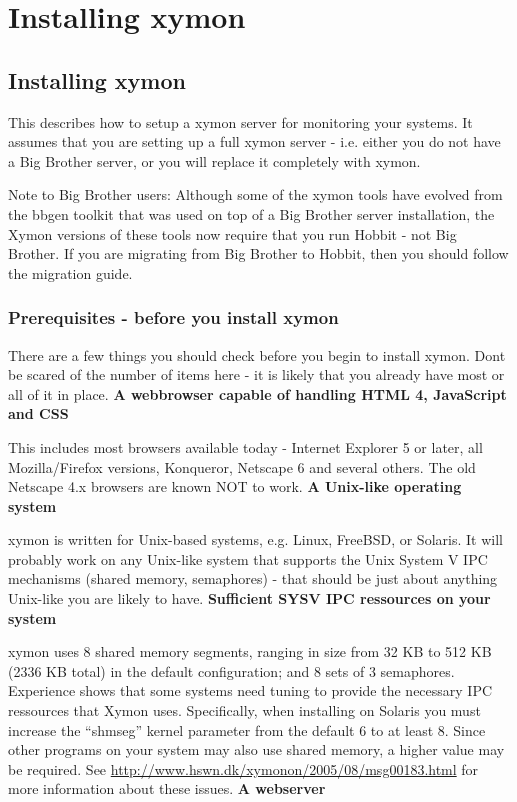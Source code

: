 \chapter{Installing xymon}
\section{Installing xymon}


 This describes how to setup a xymon server for monitoring your
 systems. It assumes that you are setting up a full xymon server -
 i.e. either you do not have a Big Brother server, or you will replace
 it completely with xymon.



 Note to Big Brother users: Although some of the xymon tools have evolved from the bbgen toolkit that was used on top of a Big Brother server installation, the Xymon versions of these tools now require that you run Hobbit - not Big Brother. If you are migrating from Big Brother to Hobbit, then you should follow the migration guide.
\subsection{Prerequisites - before you install xymon}


 There are a few things you should check before you begin to install xymon. Dont be scared of the number of items here - it is likely that you already have most or all of it in place.
\textbf{A webbrowser capable of handling HTML 4, JavaScript and CSS}


 This includes most browsers available today - Internet Explorer 5 or later, all Mozilla/Firefox versions, Konqueror, Netscape 6 and several others. The old Netscape 4.x browsers are known NOT to work.
\textbf{A Unix-like operating system}


 xymon is written for Unix-based systems, e.g. Linux, FreeBSD, or Solaris. It will probably work on any Unix-like system that supports the Unix System V IPC mechanisms (shared memory, semaphores) - that should be just about anything Unix-like you are likely to have.
\textbf{Sufficient SYSV IPC ressources on your system}


 xymon uses 8 shared memory segments, ranging in size from 32 KB to 512 KB (2336 KB total) in the default configuration; and 8 sets of 3 semaphores. Experience shows that some systems need tuning to provide the necessary IPC ressources that Xymon uses. Specifically, when installing on Solaris you must increase the ``shmseg'' kernel parameter from the default 6 to at least 8. Since other programs on your system may also use shared memory, a higher value may be required. See \url{http://www.hswn.dk/xymonon/2005/08/msg00183.html} for more information about these issues.
\textbf{A webserver}


